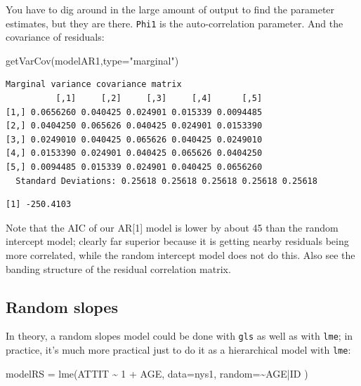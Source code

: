\documentclass[
  letterpaper,
  DIV=11,
  numbers=noendperiod]{scrreprt}
\newenvironment{Shaded}{\begin{snugshade}}{\end{snugshade}}
\newcommand{\AttributeTok}[1]{\textcolor[rgb]{0.49,0.56,0.16}{#1}}
\newcommand{\DecValTok}[1]{\textcolor[rgb]{0.25,0.63,0.44}{#1}}
\newcommand{\FunctionTok}[1]{\textcolor[rgb]{0.02,0.16,0.49}{#1}}
\newcommand{\NormalTok}[1]{\textcolor[rgb]{0.00,0.44,0.13}{#1}}
\newcommand{\OtherTok}[1]{\textcolor[rgb]{0.00,0.44,0.13}{#1}}
\newcommand{\SpecialCharTok}[1]{\textcolor[rgb]{0.25,0.44,0.63}{#1}}
\newcommand{\StringTok}[1]{\textcolor[rgb]{0.25,0.44,0.63}{#1}}
\begin{document}
You have to dig around in the large amount of output to find the
parameter estimates, but they are there. \texttt{Phi1} is the
auto-correlation parameter. And the covariance of residuals:

\begin{Shaded}
\begin{Highlighting}[]
\FunctionTok{getVarCov}\NormalTok{(modelAR1,}\AttributeTok{type=}\StringTok{"marginal"}\NormalTok{)}
\end{Highlighting}
\end{Shaded}

\begin{verbatim}
Marginal variance covariance matrix
          [,1]     [,2]     [,3]     [,4]      [,5]
[1,] 0.0656260 0.040425 0.024901 0.015339 0.0094485
[2,] 0.0404250 0.065626 0.040425 0.024901 0.0153390
[3,] 0.0249010 0.040425 0.065626 0.040425 0.0249010
[4,] 0.0153390 0.024901 0.040425 0.065626 0.0404250
[5,] 0.0094485 0.015339 0.024901 0.040425 0.0656260
  Standard Deviations: 0.25618 0.25618 0.25618 0.25618 0.25618 
\end{verbatim}

\begin{Shaded}
\end{Shaded}

\begin{verbatim}
[1] -250.4103
\end{verbatim}

Note that the AIC of our AR{[}1{]} model is lower by about 45 than the
random intercept model; clearly far superior because it is getting
nearby residuals being more correlated, while the random intercept model
does not do this. Also see the banding structure of the residual
correlation matrix.

\hypertarget{random-slopes}{%
\subsection{Random slopes}\label{random-slopes}}

In theory, a random slopes model could be done with \texttt{gls} as well
as with \texttt{lme}; in practice, it's much more practical just to do
it as a hierarchical model with \texttt{lme}:

\begin{Shaded}
\begin{Highlighting}[]
\NormalTok{modelRS }\OtherTok{=} \FunctionTok{lme}\NormalTok{(ATTIT }\SpecialCharTok{\textasciitilde{}} \DecValTok{1} \SpecialCharTok{+}\NormalTok{ AGE, }
              \AttributeTok{data=}\NormalTok{nys1,}
              \AttributeTok{random=}\SpecialCharTok{\textasciitilde{}}\NormalTok{AGE}\SpecialCharTok{|}\NormalTok{ID )}
\end{Highlighting}
\end{Shaded}
\end{document}
